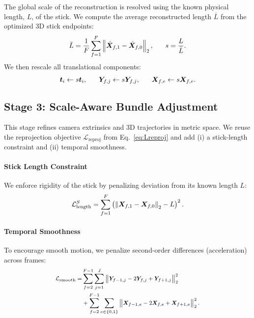 \documentclass[a4paper, 10pt, conference]{ieeeconf}      %
\newcommand{\vect}[1]{\bm{#1}}
\begin{document}
The global scale of the reconstruction is resolved using the known physical length, $L$, of the stick. We compute the average reconstructed length $\bar{L}$ from the optimized 3D stick endpoints:
\begin{equation} \footnotesize
\bar{L} = \frac{1}{F} \sum_{f=1}^{F} \left\|\hat{\vect{X}}_{f,1} - \hat{\vect{X}}_{f,0}\right\|_2,
\qquad
s = \frac{L}{\bar{L}}.
\end{equation}
We then rescale all translational components:
\begin{equation} \footnotesize
\vect{t}_i \leftarrow s\vect{t}_i,\qquad
\vect{Y}_{f,j} \leftarrow s\vect{Y}_{f,j},\qquad
\vect{X}_{f,e} \leftarrow s\vect{X}_{f,e}.
\end{equation}



\subsection{Stage 3: Scale-Aware Bundle Adjustment}

This stage refines camera extrinsics and 3D trajectories in metric space.
We reuse the reprojection objective $\mathcal{L}_{\text{reproj}}$ from Eq.~\eqref{eq:Lreproj} and add (i) a stick-length constraint and (ii) temporal smoothness.


\paragraph{Stick Length Constraint}
We enforce rigidity of the stick by penalizing deviation from its known length $L$:
\begin{equation} \footnotesize
\label{eq:Llength_stick}
\mathcal{L}_{\text{length}}^{S} = \sum_{f=1}^{F} \left( \left\|\vect{X}_{f,1} - \vect{X}_{f,0}\right\|_2 - L \right)^2.
\end{equation}

\paragraph{Temporal Smoothness}
To encourage smooth motion, we penalize second-order differences (acceleration) across frames:
\begin{equation} \footnotesize
\label{eq:Lsmooth}
\begin{split}
\mathcal{L}_{\text{smooth}} = 
&\sum_{f=2}^{F-1}\sum_{j=1}^{J}
\left\|\vect{Y}_{f-1,j} - 2\vect{Y}_{f,j} + \vect{Y}_{f+1,j}\right\|_2^2 \\
&+ \sum_{f=2}^{F-1}\sum_{e\in\{0,1\}}
\left\|\vect{X}_{f-1,e} - 2\vect{X}_{f,e} + \vect{X}_{f+1,e}\right\|_2^2.
\end{split}
\end{equation}
\end{document}
